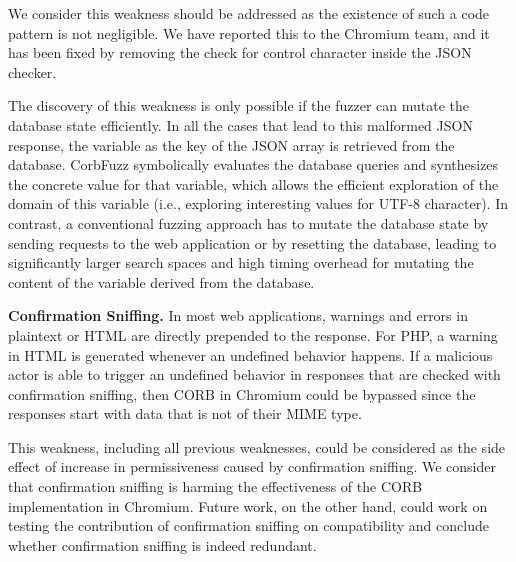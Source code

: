 \documentclass[10pt,conference]{IEEEtran}
\begin{document}
We consider this weakness should be addressed as the existence of such a code pattern is not negligible. We have reported this to the Chromium team, and it has been fixed by removing the check for control character inside the JSON checker. 

The discovery of this weakness is only possible if the fuzzer can mutate the database state efficiently. In all the cases that lead to this malformed JSON response, the variable as the key of the JSON array is retrieved from the database. CorbFuzz symbolically evaluates the database queries and synthesizes the concrete value for that variable, which allows the efficient exploration of the domain of this variable (i.e., exploring interesting values for UTF-8 character). In contrast, a conventional fuzzing approach has to mutate the database state by sending requests to the web application or by resetting the database, leading to significantly larger search spaces and high timing overhead for mutating the content of the variable derived from the database.


\textbf{Confirmation Sniffing.} In most web applications, warnings and errors in plaintext or HTML are directly prepended to the response. For PHP, a warning in HTML is generated whenever an undefined behavior happens. If a malicious actor is able to trigger an undefined behavior in responses that are checked with confirmation sniffing, then CORB in Chromium could be bypassed since the responses start with data that is not of their MIME type.%

This weakness, including all previous weaknesses, could be considered as the side effect of increase in permissiveness caused by confirmation sniffing. We consider that confirmation sniffing is harming the effectiveness of the CORB implementation in Chromium. Future work, on the other hand, could work on testing the contribution of confirmation sniffing on compatibility and conclude whether confirmation sniffing is indeed redundant. 
\end{document}
